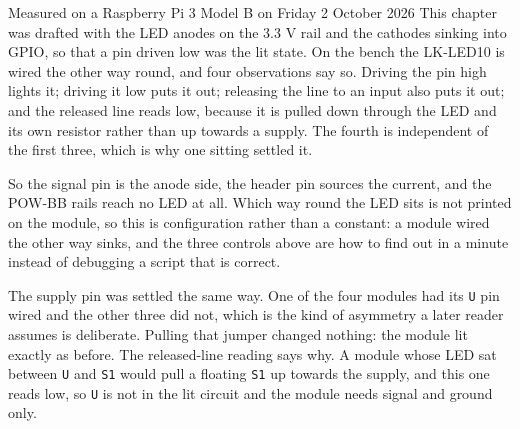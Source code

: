 \begin{note}{Measured on a Raspberry Pi 3 Model B on Friday 2 October 2026}
This chapter was drafted with the LED anodes on the 3.3 V rail and the cathodes sinking into GPIO, so that a pin driven low was the lit state. On the bench the LK-LED10 is wired the other way round, and four observations say so. Driving the pin high lights it; driving it low puts it out; releasing the line to an input also puts it out; and the released line reads low, because it is pulled down through the LED and its own resistor rather than up towards a supply. The fourth is independent of the first three, which is why one sitting settled it.

So the signal pin is the anode side, the header pin sources the current, and the POW-BB rails reach no LED at all. Which way round the LED sits is not printed on the module, so this is configuration rather than a constant: a module wired the other way sinks, and the three controls above are how to find out in a minute instead of debugging a script that is correct.

The supply pin was settled the same way. One of the four modules had its \texttt{U} pin wired and the other three did not, which is the kind of asymmetry a later reader assumes is deliberate. Pulling that jumper changed nothing: the module lit exactly as before. The released-line reading says why. A module whose LED sat between \texttt{U} and \texttt{S1} would pull a floating \texttt{S1} up towards the supply, and this one reads low, so \texttt{U} is not in the lit circuit and the module needs signal and ground only.
\end{note}

